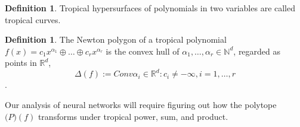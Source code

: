 \documentclass{article}
\theoremstyle{definition}
\newtheorem{definition}[theorem]{Definition}
\newtheorem{comment}[theorem]{Comment}
\begin{document}
\begin{definition}
Tropical hypersurfaces of polynomials in two variables are called tropical curves.
\end{definition}

\begin{definition}
The Newton polygon of a tropical polynomial $f(x) = c_1 x^{\alpha_1} \oplus \dots \oplus c_r x^{\alpha_r}$  is the convex hull of $\alpha_1 , \dots , \alpha_r \in \mathbb{N}^{d}$, regarded as points in $\mathbb{R}^{d}$,
$$ \Delta(f) := Conv{\alpha_i \in \mathbb{R}^{d} : c_i \neq -\infty , i = 1, \dots ,r } $$ \cite[p.~3]{zhang2018tropical}.
\end{definition}

Our analysis of neural networks will require figuring out
how the polytope $\mathcal(P)(f)$ transforms under tropical power,
sum, and product.
\end{document}
